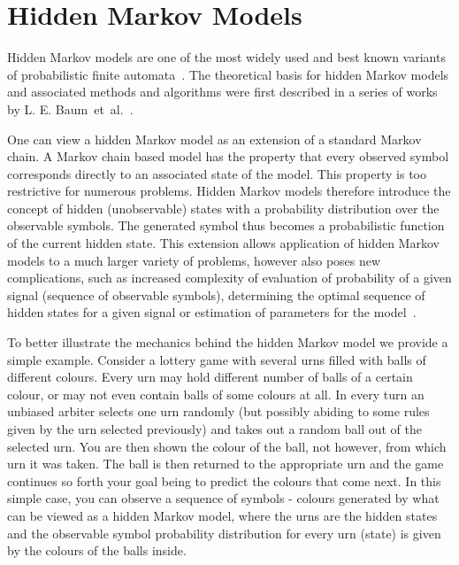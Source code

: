 \section{Hidden Markov Models}

Hidden Markov models are one of the most widely used and best known variants of probabilistic finite automata~\cite{pautomacTR, Rabiner89hmm}. The theoretical basis for hidden Markov models and associated methods and algorithms were first described in a series of works by L. E. Baum~et~al.~\cite{baum1966, baum1967, baum1968, baum1970, baum1972}.

One can view a hidden Markov model as an extension of a standard Markov chain. A Markov chain based model has the property that every observed symbol corresponds directly to an associated state of the model. This property is too restrictive for numerous problems. Hidden Markov models therefore introduce the concept of hidden (unobservable) states with a probability distribution over the observable symbols. The generated symbol thus becomes a probabilistic function of the current hidden state. This extension allows application of hidden Markov models to a much larger variety of problems, however also poses new complications, such as increased complexity of evaluation of probability of a given signal (sequence of observable symbols), determining the optimal sequence of hidden states for a given signal or estimation of parameters for the model~\cite{Rabiner89hmm}.

To better illustrate the mechanics behind the hidden Markov model we provide a simple example. Consider a lottery game with several urns filled with balls of different colours. Every urn may hold different number of balls of a certain colour, or may not even contain balls of some colours at all. In every turn an unbiased arbiter selects one urn randomly (but possibly abiding to some rules given by the urn selected previously) and takes out a random ball out of the selected urn. You are then shown the colour of the ball, not however, from which urn it was taken. The ball is then returned to the appropriate urn and the game continues so forth your goal being to predict the colours that come next. In this simple case, you can observe a sequence of symbols - colours generated by what can be viewed as a hidden Markov model, where the urns are the hidden states and the observable symbol probability distribution for every urn (state) is given by the colours of the balls inside.


